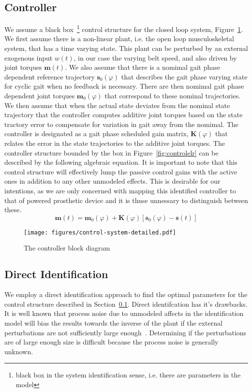 \documentclass{article}
\begin{document}
\subsection{Controller}
\label{sec:controller}
%
We assume a black box~\footnote{black box in the system identification sense,
i.e. there are parameters in the model} control structure for the closed loop
system, Figure~\ref{fig:controller}. We first assume there is a non-linear
plant, i.e. the open loop musculoskeletal system, that has a time varying
state. This plant can be perturbed by an external exogenous input $w(t)$, in
our case the varying belt speed, and also driven by joint torques
$\mathbf{m}(t)$. We also assume that there is a nomimal gait phase dependent
reference trajectory $\mathbf{s}_0(\varphi)$ that describes the gait phase
varying state for cyclic gait when no feedback is necessary. There are then
nomimal gait phase dependent joint torques $\mathbf{m}_0(\varphi)$ that
correspond to these nominal trajectories. We then assume that when the actual
state deviates from the nominal state trajectory that the controller computes
additive joint torques based on the state tractory error to compensate for
variation in gait away from the nomimal. The controller is designated as a gait
phase scheduled gain matrix, $\mathbf{K}(\varphi)$ that relates the error in
the state trajectories to the additive joint torques. The controller structure
bounded by the box in Figure~\ref{fig:controlelr} can be described by the
following algebraic equation. It is important to note that this control
structure will effectively lump the passive control gains with the active ones
in addition to any other unmodeled effects. This is desirable for our
intentions, as we are only concerned with mapping this identified controller to
that of powered prosthetic device and it is thuse unnessary to distinguish
between these.
%
\begin{equation}
  \mathbf{m}(t) = \mathbf{m}_0(\varphi) + \mathbf{K}(\varphi) [\mathbf{s}_0(\varphi) - \mathbf{s}(t)]
  \label{eq:controller}
\end{equation}

\begin{figure}
  \begin{center}
    \texttt{[image: figures/control-system-detailed.pdf]}
    \caption{The controller block diagram}
    \label{fig:controller}
  \end{center}
\end{figure}

\subsection{Direct Identification}
%
We employ a direct identification approach to find the optimal parameters for
the control structure described in Section~\ref{sec:controller}. Direct
identifcation has it's drawbacks. It is well known that process noise due to
unmodeled affects in the identification model will bias the results towards the
inverse of the plant if the external perturbations are not sufficiently large
enough~\cite{Ljung1999,Kearney1990,Kooij2005}. Determining if the perturbations
are of large enough size is difficult because the process noise is generally
unknown.
\end{document}

